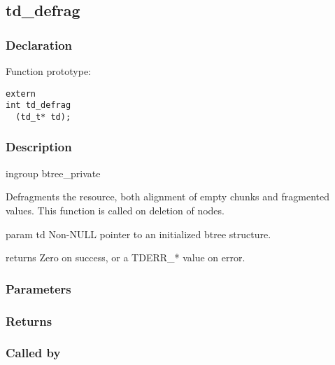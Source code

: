 
\newpage
\subsection{td\_defrag}
\subsubsection{Declaration} Function prototype:

\begin{verbatim}
extern
int td_defrag
  (td_t* td);
\end{verbatim}

\subsubsection{Description}


 ingroup btree\_private

 Defragments the resource, both alignment of empty chunks and fragmented
 values. This function is called on deletion of nodes.

 param td Non-NULL pointer to an initialized btree structure.

 returns Zero on success, or a TDERR\_* value on error.
 

\subsubsection{Parameters}
\subsubsection{Returns}
\subsubsection{Called by}
